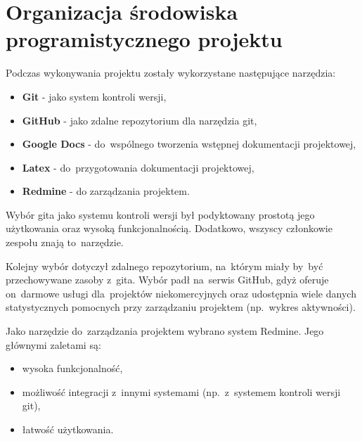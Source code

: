 \chapter[Organizacja środowiska programistycznego projektu][Organizacja
środowiska programistycznego projektu]{Organizacja środowiska programistycznego
projektu}
Podczas wykonywania projektu zostały wykorzystane następujące narzędzia:
\begin{itemize}
  \item \textbf{Git} - jako system kontroli wersji,
  \item \textbf{GitHub} - jako zdalne repozytorium dla narzędzia git,
  \item \textbf{Google Docs} - do~wspólnego tworzenia wstępnej dokumentacji
  projektowej,
  \item \textbf{Latex} - do~przygotowania dokumentacji projektowej,
  \item \textbf{Redmine} - do zarządzania projektem.
\end{itemize}

\vspace{5mm}
Wybór gita jako systemu kontroli wersji był podyktowany prostotą jego
użytkowania oraz wysoką funkcjonalnością. Dodatkowo, wszyscy członkowie zespołu
znają to~narzędzie.

\vspace{5mm}
Kolejny wybór dotyczył zdalnego repozytorium, na~którym miały by~być
przechowywane zasoby z~gita. Wybór padł na~serwis GitHub, gdyż oferuje
on~darmowe usługi dla~projektów niekomercyjnych oraz udostępnia wiele danych
statystycznych pomocnych przy zarządzaniu projektem (np.~wykres aktywności).

\vspace{5mm}
Jako narzędzie do~zarządzania projektem wybrano system Redmine. Jego głównymi
zaletami są:
\begin{itemize}
  \item wysoka funkcjonalność,
  \item możliwość integracji z~innymi systemami (np.~z~systemem kontroli wersji
  git),
  \item łatwość użytkowania.
\end{itemize}
